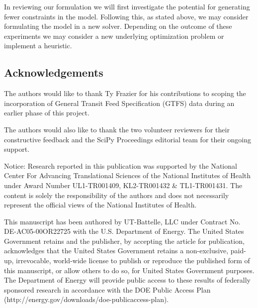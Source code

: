 \begin{itemize}
    In reviewing our formulation we will first investigate the potential for generating fewer constraints in the model. Following this, as stated above, we may consider formulating the model in a new solver. Depending on the outcome of these experiments we may consider a new underlying optimization problem or implement a heuristic.
\end{itemize}

\subsection{Acknowledgements}

The authors would like to thank Ty Frazier for his contributions to scoping the incorporation of General Transit Feed Specification (GTFS) data during an earlier phase of this project.

The authors would also like to thank the two volunteer reviewers for their constructive feedback and the SciPy Proceedings editorial team for their ongoing support.

Notice: Research reported in this publication was supported by the National Center For Advancing Translational Sciences of the National Institutes of Health under Award Number UL1-TR001409, KL2-TR001432 \& TL1-TR001431. The content is solely the responsibility of the authors and does not necessarily represent the official views of the National Institutes of Health.

This manuscript has been authored by UT-Battelle, LLC under Contract No. DE-AC05-00OR22725 with the U.S. Department of Energy. The United States Government retains and the publisher, by accepting the article for publication, acknowledges that the United States Government retains a non-exclusive, paid-up, irrevocable, world-wide license to publish or reproduce the published form of this manuscript, or allow others to do so, for United States Government purposes. The Department of Energy will provide public access to these results of federally sponsored research in accordance with the DOE Public Access Plan (http://energy.gov/downloads/doe-publicaccess-plan).





